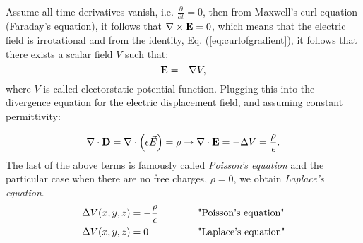 Assume all time derivatives vanish, i.e. $\frac{\partial }{\partial t} = 0  $, then from Maxwell's curl equation (Faraday's equation), it follows that $\mathbf{\nabla}\times \mathbf{E} = 0 $, which means that the electric field is irrotational and from the
identity, Eq. (\ref{eq:curlofgradient}), it follows that there exists a scalar field $V$ such that:
\begin{equation*}
  \mathbf{E}=-\mathbf{\nabla} V, 
\end{equation*}
where $V$ is called electorstatic potential function. Plugging this into the divergence equation for the electric displacement field, and assuming constant permittivity:

\begin{equation*}
  \mathbf{\nabla}\cdot \mathbf{D} = \mathbf{\nabla}\cdot \left ( \epsilon \vec {E} \right ) = \rho \rightarrow \mathbf{\nabla}\cdot \mathbf{E} = -\Delta {V}=\frac{\rho}{\epsilon}.
\end{equation*}
The last of the above terms is famously called \emph{Poisson's equation} and the particular case when there are no free charges, $\rho = 0 $, we obtain \emph{Laplace's equation}.
\begin{alignat}{2}
  \Delta V(x,y,z) &= -\frac{\rho}{\epsilon}  &\quad\quad\quad &\text{"Poisson's equation"}  \label{eq:possonequation}\\
  \Delta V(x,y,z) &= 0  &\quad\quad\quad &\text{"Laplace's equation"} \label{eq:laplaceequation}
\end{alignat}
\\ 

